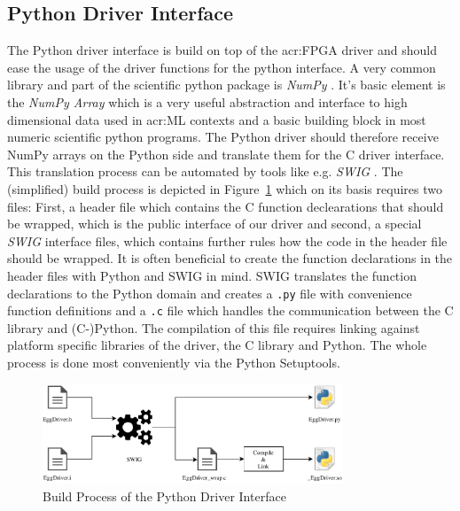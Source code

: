 \subsection{Python Driver Interface}
\label{sec:sw-python}

The Python driver interface is build on top of the \gls{acr:FPGA} driver and should ease the usage of the driver functions for the python interface. A very common library and part of the scientific python package is \emph{NumPy} \cite{Virtanen:2020aa}. It's basic element is the \emph{NumPy Array} \cite{Walt:2011aa} which is a very useful abstraction and interface to high dimensional data used in \gls{acr:ML} contexts and a basic building block in most numeric scientific python programs. The Python driver should therefore receive NumPy arrays on the Python side and translate them for the C driver interface. 
This translation process can be automated by tools like e.g. \emph{SWIG} \cite{Beazley:2003aa}.	The (simplified) build process is depicted in Figure~\ref{fig:sw-python-eggdriver-build} which on its basis requires two files: 
First, a header file which contains the C function declearations that should be wrapped, which is the public interface of our driver and second, a special \emph{SWIG} interface files, which contains further rules how the code in the header file should be wrapped. It is often beneficial to create the function declarations in the header files with Python and SWIG in mind. 
SWIG translates the function declarations to the Python domain and creates a \texttt{.py} file with convenience function definitions and a \texttt{.c} file which handles the communication between the C library and (C-)Python. The compilation of this file requires linking against platform specific libraries of the driver, the C library and Python. The whole process is done most conveniently via the Python Setuptools.

\begin{figure}[hbt]
  \centering
  \includegraphics[width=0.8\textwidth]{img/pydriver}
  \caption{Build Process of the Python Driver Interface}
  \label{fig:sw-python-eggdriver-build}
\end{figure}



